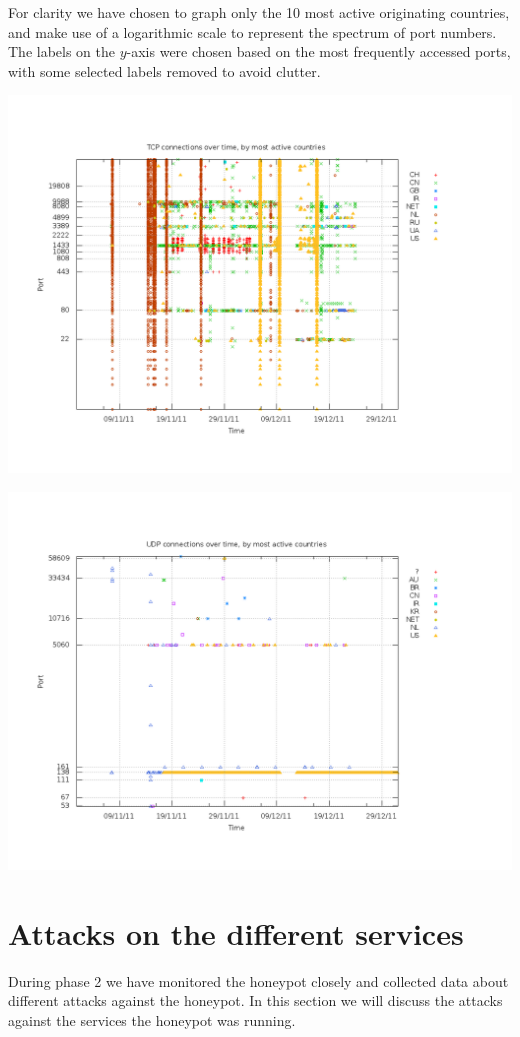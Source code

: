 \documentclass[11pt]{article}
\begin{document}
For clarity we have chosen to graph only the 10 most active originating countries, and make use of a logarithmic scale to represent the spectrum of port numbers.
The labels on the \(y\)-axis were chosen based on the most frequently accessed ports, with some selected labels removed to avoid clutter.

\includegraphics[width=1.7\textwidth,angle=-90]{tcp}

\includegraphics[width=1.7\textwidth,angle=-90]{udp}

\section{Attacks on the different services}
\label{Attacks}
During phase 2 we have monitored the honeypot closely and collected data about different attacks against the honeypot. In this section we will discuss the attacks against the services the honeypot was running.
\end{document}
